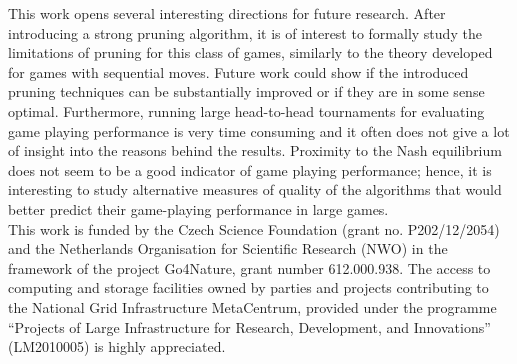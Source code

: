 This work opens several interesting directions for future research. After introducing a strong pruning algorithm, it is of interest to formally study the limitations of pruning  for this class of games, similarly to the theory developed for games with sequential moves. Future work could show if the introduced pruning techniques can be substantially improved or if they are in some sense optimal.
Furthermore, running large head-to-head tournaments for evaluating game playing performance is very time consuming and it often does not give a lot of insight into the reasons behind the results. Proximity to the Nash equilibrium does not seem to be a good indicator of game playing performance; hence, it is interesting to study alternative measures of quality of the algorithms that would better predict their game-playing performance in large games. \\

 This work is funded by the Czech Science Foundation (grant no. P202/12/2054) and the Netherlands
Organisation for Scientific Research (NWO) in the framework of the project Go4Nature, grant number 612.000.938.
The access to computing and storage facilities owned by parties and projects contributing to the National Grid
Infrastructure MetaCentrum, provided under the
programme ``Projects of Large Infrastructure for Research, Development, and Innovations'' (LM2010005) is highly appreciated.

